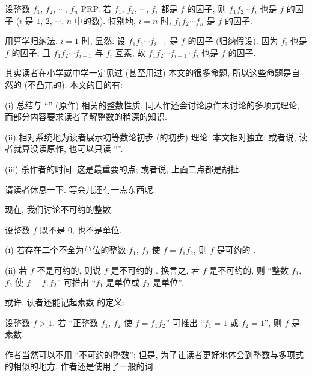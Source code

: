 \begin{proposition}
    设整数 $f_1$, $f_2$, $\cdots$, $f_n$ PRP. 若 $f_1$, $f_2$, $\cdots$, $f_i$ 都是 $f$ 的因子, 则 $f_1 f_2 \cdots f_i$ 也是 $f$ 的因子 ($i$ 是 $1$, $2$, $\cdots$, $n$ 中的数). 特别地, $i = n$ 时, $f_1 f_2 \cdots f_n$ 是 $f$ 的因子.
\end{proposition}

\begin{pf}
    用算学归纳法. $i = 1$ 时, 显然. 设 $f_1 f_2 \cdots f_{i-1}$ 是 $f$ 的因子 (归纳假设). 因为 $f_i$ 也是 $f$ 的因子, 且 $f_1 f_2 \cdots f_{i-1}$ 与 $f_i$ 互素, 故 $f_1 f_2 \cdots f_{i-1} \cdot f_i$ 也是 $f$ 的因子.
\end{pf}

\begin{remark}
    其实读者在小学或中学一定见过 (甚至用过) 本文的很多命题, 所以这些命题是自然的 (不凸兀的). 本文的目的有:

    (i) 总结与 ``\HEADING '' (原作) 相关的整数性质. 同人作还会讨论原作未讨论的多项式理论, 而部分内容要求读者了解整数的稍深的知识.

    (ii) 相对系统地为读者展示初等数论初步 (的初步) 理论. 本文相对独立; 或者说, 读者就算没读原作, 也可以只读 ``\SomePropertiesOfIntegers ''.

    (iii) 杀作者的时间. 这是最重要的点; 或者说, 上面二点都是胡扯.

    请读者休息一下. 等会儿还有一点东西呢.
\end{remark}

\myLine

现在, 我们讨论不可约的整数.

\begin{definition}
    设整数 $f$ 既不是 $0$, 也不是单位.

    (i) 若存在二个不全为单位的整数 $f_1$, $f_2$ 使 $f = f_1 f_2$, 则 $f$ 是可约的 .

    (ii) 若 $f$ 不是可约的, 则说 $f$ 是不可约的 . 换言之, 若 $f$ 是不可约的, 则 ``整数 $f_1$, $f_2$ 使 $f = f_1 f_2$'' 可推出 ``$f_1$ 是单位或 $f_2$ 是单位''.
\end{definition}

\begin{remark}
    或许, 读者还能记起素数  的定义:

    设整数 $f > 1$. 若 ``正整数 $f_1$, $f_2$ 使 $f = f_1 f_2$'' 可推出 ``$f_1 = 1$ 或 $f_2 = 1$'', 则 $f$ 是素数.

    作者当然可以不用 ``不可约的整数''; 但是, 为了让读者更好地体会到整数与多项式的相似的地方, 作者还是使用了一般的词.
\end{remark}

